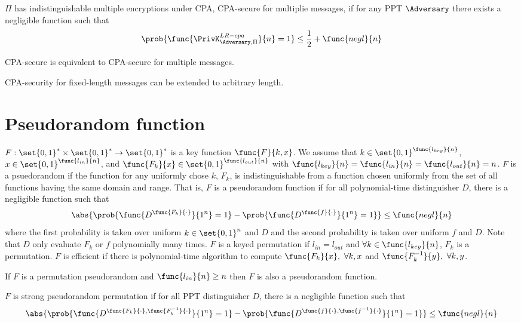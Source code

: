 \(\Pi\) has indistinguishable multiple encryptions under CPA, CPA-secure for multiplie messages, if for any PPT \(\Adversary\) there exists a negligible function such that 
\begin{equation*}
    \prob{\func{\PrivK_{\Adversary,\Pi}^{LR-cpa}}{n} = 1} \leq \frac{1}{2} + \func{negl}{n}
\end{equation*}

\begin{theorem}
    CPA-secure is equivalent to CPA-secure for multiple messages.
\end{theorem}

\begin{corollary}
    CPA-security for fixed-length messages can be extended to arbitrary length.
\end{corollary}

\section{Pseudorandom function}
\(F: \set{0,1}^{\ast} \times \set{0,1}^{\ast} \to \set{0,1}^{\ast}\) is a key function \(\func{F}{k,x}\). We assume that \(k \in \set{0,1}^{\func{l_{key}}{n}}\), \(x \in \set{0,1}^{\func{l_{in}}{n}}\), and \(\func{F_k}{x} \in \set{0,1}^{\func{l_{out}}{n}}\) with \(\func{l_{key}}{n} = \func{l_{in}}{n} = \func{l_{out}}{n} = n\). \(F\) is a psuedorandom if the function for any uniformly chose \(k\), \(F_k\), is indistinguishable from a function chosen uniformly from the set of all functions having the same domain and range. That is, \(F\) is a pseudorandom function if for all polynomial-time distinguisher \(D\), there is a negligible function such that 
\begin{equation*}
    \abs{\prob{\func{D^{\func{F_k}{\cdot}}}{1^n} = 1} - \prob{\func{D^{\func{f}{\cdot}}}{1^n} = 1}} \leq \func{negl}{n}
\end{equation*}
where the first probability is taken over uniform \(k \in \set{0,1}^n\) and \(D\) and the second probability is taken over uniform \(f\) and \(D\). Note that \(D\) only evaluate \(F_k\) or \(f\) polynomially many times. \(F\) is a keyed permutation if \(l_{in} = l_{out}\) and \(\forall k \in \func{l_{key}}{n}\), \(F_k\) is a permutation. \(F\) is efficient if there is polynomial-time algorithm to compute \(\func{F_k}{x}, \ \forall k,x\) and \(\func{F^{-1}_k}{y}, \ \forall k,y\). 

\begin{proposition}
    If \(F\) is a permutation pseudorandom and \(\func{l_{in}}{n} \geq n\) then \(F\) is also a pseudorandom function.
\end{proposition}

\begin{definition}
    \(F\) is strong pseudorandom permutation if for all PPT distinguisher \(D\), there is a negligible function such that 
    \begin{equation*}
        \abs{\prob{\func{D^{\func{F_k}{\cdot}, \func{F_k^{-1}}{\cdot}}}{1^n} = 1} - \prob{\func{D^{\func{f}{\cdot}, \func{f^{-1}}{\cdot}}}{1^n} = 1}} \leq \func{negl}{n}
    \end{equation*}
\end{definition}